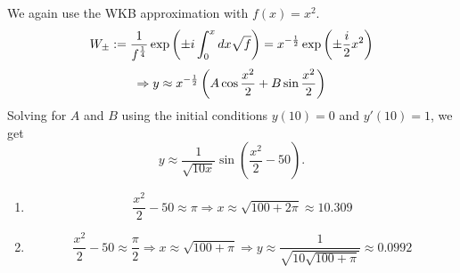 \item
We again use the WKB approximation with $f(x) = x^2$.
\[
	W_\pm
	:= \frac{1}{f^{\frac{1}{4}}} \exp\left( \pm i \int_0^x dx \sqrt{f} \right)
	= x^{-\frac{1}{2}} \exp\left( \pm \frac{i}{2}x^2 \right)
\]
\[
	\Rightarrow y \approx x^{-\frac{1}{2}} \left( A \cos \frac{x^2}{2} + B \sin \frac{x^2}{2} \right)
\]
Solving for $A$ and $B$ using the initial conditions $y(10) = 0$ and $y'(10) = 1$, we get
\[
	y \approx \frac{1}{\sqrt{10x}} \sin\left( \frac{x^2}{2} - 50 \right).
\]

\begin{enumerate}[wide, labelindent = 0pt, label = (\alph*)]
\item
\[
	\frac{x^2}{2} - 50 \approx \pi
	\Rightarrow x \approx \sqrt{100 + 2\pi} \approx 10.309
\]
\item
\[
	\frac{x^2}{2} - 50 \approx \frac{\pi}{2}
	\Rightarrow x \approx \sqrt{100 + \pi}
	\Rightarrow y \approx \frac{1}{\sqrt{10 \sqrt{100 + \pi}}} \approx 0.0992
\]

\end{enumerate}